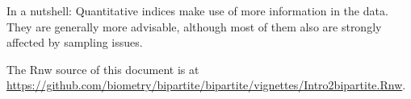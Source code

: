 \documentclass[a4paper, 11pt]{article}\usepackage[]{graphicx}\usepackage[]{color}
\begin{document}
In a nutshell: Quantitative indices make use of more information in the data. They are generally more advisable, although most of them also are strongly affected by sampling issues.


\bigskip

The Rnw source of this document is at \url{https://github.com/biometry/bipartite/bipartite/vignettes/Intro2bipartite.Rnw}.

\setlength{\bibsep}{0cm}
\def\bibfont{\small}



\printindex
\end{document}
